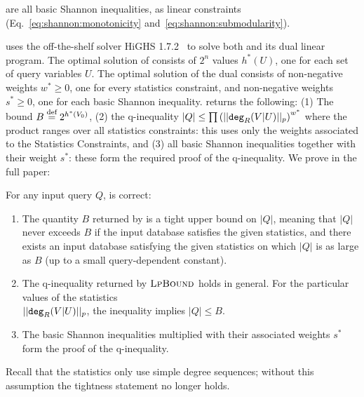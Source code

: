  are all basic Shannon inequalities,
as linear constraints (Eq.~\eqref{eq:shannon:monotonicity}
and~\eqref{eq:shannon:submodularity}).
%

\system uses the off-the-shelf solver HiGHS 1.7.2~\cite{HiGHS:2018} to solve both
\lpbase and its dual linear program.  The optimal solution of \lpbase
 consists of $2^n$ values $h^*(U)$, one for each set of query
variables $U$.  The optimal solution of the dual consists of
non-negative weights $w^*\geq 0$, one for every statistics constraint, and
non-negative weights $s^* \geq 0$, one for each basic Shannon inequality.
\system returns the following: (1) The bound $B \stackrel{\text{def}}{=} 2^{h^*(V_0)}$,
(2) the q-inequality
$|Q| \leq \prod \left(||\texttt{deg}_R(V|U)||_p\right)^{w^*}$ where the
product ranges over all statistics constraints: this uses only the
weights associated to the Statistics Constraints, and (3) all basic
Shannon inequalities together with their weight $s^*$: these form the
required proof of the q-inequality.  We prove in the full paper:

\begin{theorem} For any input query $Q$, \system is correct:
\begin{enumerate}
    \item The quantity $B$ returned by \system is a tight upper bound on $|Q|$, meaning that $|Q|$ never exceeds $B$ if the input database satisfies the given statistics, and there exists an input database satisfying the given statistics on which
  $|Q|$ is as large as $B$ (up to a small query-dependent
  constant).
    \item The q-inequality returned by $\textsc{LpBound}$ holds in
  general. For the particular values of the statistics \\
  $||\texttt{deg}_R(V|U)||_p$, the inequality implies $|Q| \leq B$. 
    \item The basic Shannon inequalities multiplied with their associated
  weights $s^*$ form the proof of the q-inequality.
\end{enumerate}
\end{theorem}

Recall that the statistics only use simple degree sequences; without this assumption the tightness statement no
longer holds.


